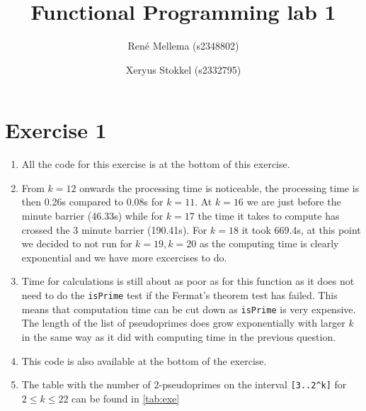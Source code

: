 \documentclass[a4paper]{article}
\title{Functional Programming lab 1}
\author{Ren\'e Mellema (s2348802) \and Xeryus Stokkel (s2332795)}
\begin{document}
\maketitle

\section*{Exercise 1}
\begin{enumerate}
	\item All the code for this exercise is at the bottom of this exercise.
	\item From $k=12$ onwards the processing time is noticeable, the processing time is then 0.26s compared to 0.08s for $k=11$. At $k=16$ we are just before the minute barrier (46.33s) while for $k=17$ the time it takes to compute has crossed the 3 minute barrier (190.41s). For $k=18$ it took 669.4s, at this point we decided to not run for $k=19,k=20$ as the computing time is clearly exponential and we have more excercises to do.
	\item Time for calculations is still about as poor as for this function as it does not need to do the \texttt{isPrime} test if the Fermat's theorem test has failed. This means that computation time can be cut down as \texttt{isPrime} is very expensive. The length of the list of pseudoprimes does grow exponentially with larger $k$ in the same way as it did with computing time in the previous question.
	\item This code is also available at the bottom of the exercise.
	\item The table with the number of 2-pseudoprimes on the interval \lstinline{[3..2^k]} for $2 \le k \le 22$ can be found in \autoref{tab:exe}
\end{enumerate}
\end{document}
